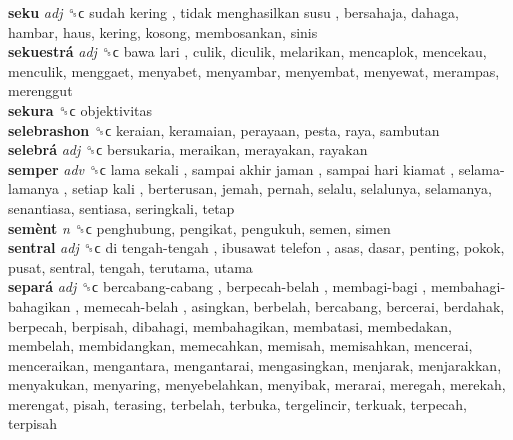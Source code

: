 \textbf{seku} \emph{adj}  ␝ϲ   sudah kering ,  tidak menghasilkan susu , bersahaja, dahaga, hambar, haus, kering, kosong, membosankan, sinis  \\
\textbf{sekuestrá} \emph{adj}  ␝ϲ   bawa lari , culik, diculik, melarikan, mencaplok, mencekau, menculik, menggaet, menyabet, menyambar, menyembat, menyewat, merampas, merenggut  \\
\textbf{sekura} ␝ϲ  objektivitas  \\
\textbf{selebrashon} ␝ϲ  keraian, keramaian, perayaan, pesta, raya, sambutan  \\
\textbf{selebrá} \emph{adj}  ␝ϲ  bersukaria, meraikan, merayakan, rayakan  \\
\textbf{semper} \emph{adv}  ␝ϲ   lama sekali ,  sampai akhir jaman ,  sampai hari kiamat ,  selama-lamanya ,  setiap kali , berterusan, jemah, pernah, selalu, selalunya, selamanya, senantiasa, sentiasa, seringkali, tetap  \\
\textbf{semènt} \emph{n}  ␝ϲ  penghubung, pengikat, pengukuh, semen, simen  \\
\textbf{sentral} \emph{adj}  ␝ϲ   di tengah-tengah ,  ibusawat telefon , asas, dasar, penting, pokok, pusat, sentral, tengah, terutama, utama  \\
\textbf{separá} \emph{adj}  ␝ϲ   bercabang-cabang ,  berpecah-belah ,  membagi-bagi ,  membahagi-bahagikan ,  memecah-belah , asingkan, berbelah, bercabang, bercerai, berdahak, berpecah, berpisah, dibahagi, membahagikan, membatasi, membedakan, membelah, membidangkan, memecahkan, memisah, memisahkan, mencerai, menceraikan, mengantara, mengantarai, mengasingkan, menjarak, menjarakkan, menyakukan, menyaring, menyebelahkan, menyibak, merarai, meregah, merekah, merengat, pisah, terasing, terbelah, terbuka, tergelincir, terkuak, terpecah, terpisah  \\
